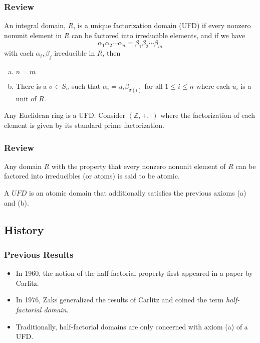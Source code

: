 \begin{frame}
  \frametitle{Review}
  \begin{definition}
    An integral domain, $R$, is a \alert{unique factorization domain (UFD)} if every nonzero nonunit element in $R$ can be factored into irreducible elements, and if we have
    $$ \alpha_1 \alpha_2 \cdots \alpha_n = \beta_1 \beta_2 \cdots \beta_m $$
    with each $\alpha_i, \beta_j$ irreducible in $R$, then
    \begin{enumerate}[(a)]
      \item $n = m$
      \item There is a $\sigma \in S_n$ such that $\alpha_i = u_i \beta_{\sigma(i)}$ for all $1 \leq i \leq n$ where each $u_i$ is a unit of $R$.
    \end{enumerate}
  \end{definition}
\end{frame}
\begin{frame}
  \begin{example}
    Any Euclidean ring is a UFD.
    Consider $(\mathbb{Z}, +, \cdot)$ where the factorization of each element is given by its standard prime factorization.
  \end{example}
\end{frame}

\begin{frame}
  \frametitle{Review}
  \begin{definition}
    Any domain $R$ with the property that every nonzero nonunit element of $R$ can be factored into irreducibles (or atoms) is said to be \alert{atomic}.
  \end{definition}
  \pause
  \begin{fact}
    A $UFD$ is an atomic domain that additionally satisfies the previous axioms (a) and (b).
  \end{fact}
\end{frame}

\subsection{History}

\begin{frame}
  \frametitle{Previous Results}
  \begin{itemize}
    \item<1-> In 1960, the notion of the half-factorial property first appeared in a paper by Carlitz.
    \item<2-> In 1976, Zaks generalized the results of Carlitz and coined the term \emph{half-factorial domain}.
    \item<3-> Traditionally, half-factorial domains are only concerned with axiom (a) of a UFD.
  \end{itemize}
\end{frame}

